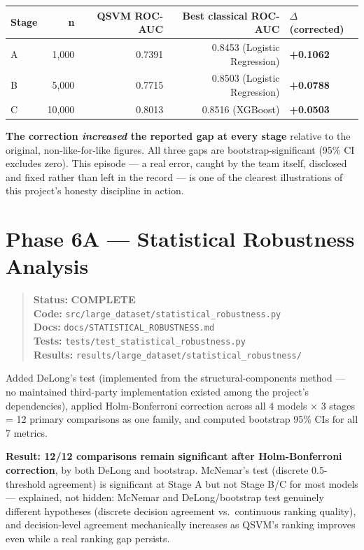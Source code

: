 \documentclass[11pt,a4paper]{article}
\newcommand{\code}[1]{\texttt{\small #1}}
\newcommand{\done}{\textcolor{donecolor}{\textbf{COMPLETE}}}
\newcommand{\phasestatus}[5]{%
\begin{quote}\small\raggedright
\textbf{Status:} #1 \\
\textbf{Code:} #2 \\
\textbf{Docs:} #3 \\
\textbf{Tests:} #4 \\
\textbf{Results:} #5
\end{quote}}
\begin{document}
\begin{center}
\small
\begin{tabular}{@{}lrrrl@{}}
\toprule
\textbf{Stage} & \textbf{n} & \textbf{QSVM ROC-AUC} & \textbf{Best classical ROC-AUC} & \textbf{$\Delta$ (corrected)} \\
\midrule
A & 1,000 & 0.7391 & 0.8453 (Logistic Regression) & \textbf{+0.1062} \\
B & 5,000 & 0.7715 & 0.8503 (Logistic Regression) & \textbf{+0.0788} \\
C & 10,000 & 0.8013 & 0.8516 (XGBoost) & \textbf{+0.0503} \\
\bottomrule
\end{tabular}
\end{center}

\textbf{The correction \emph{increased} the reported gap at every stage} relative to the original, non-like-for-like figures. All three gaps are bootstrap-significant (95\% CI excludes zero). This episode --- a real error, caught by the team itself, disclosed and fixed rather than left in the record --- is one of the clearest illustrations of this project's honesty discipline in action.

\section{Phase 6A --- Statistical Robustness Analysis}
\label{sec:phase6a}

\phasestatus{\done}{\code{src/large\_dataset/statistical\_robustness.py}}{\code{docs/STATISTICAL\_ROBUSTNESS.md}}{\code{tests/test\_statistical\_robustness.py}}{\code{results/large\_dataset/statistical\_robustness/}}

Added DeLong's test (implemented from the structural-components method --- no maintained third-party implementation existed among the project's dependencies), applied Holm-Bonferroni correction across all 4 models $\times$ 3 stages = 12 primary comparisons as one family, and computed bootstrap 95\% CIs for all 7 metrics.

\textbf{Result: 12/12 comparisons remain significant after Holm-Bonferroni correction}, by both DeLong and bootstrap. McNemar's test (discrete 0.5-threshold agreement) is significant at Stage A but not Stage B/C for most models --- explained, not hidden: McNemar and DeLong/bootstrap test genuinely different hypotheses (discrete decision agreement vs.\ continuous ranking quality), and decision-level agreement mechanically increases as QSVM's ranking improves even while a real ranking gap persists.
\end{document}
